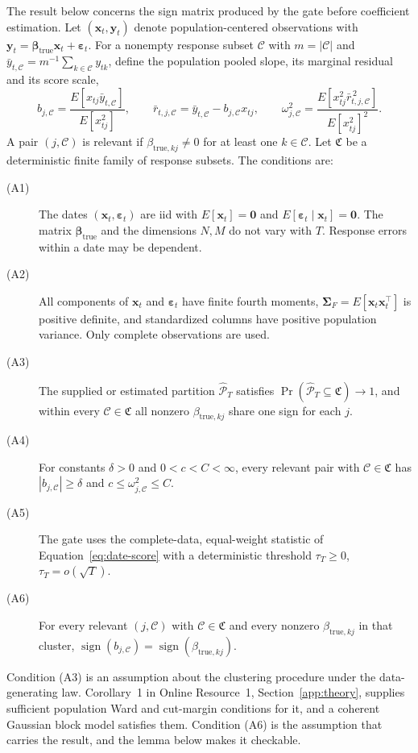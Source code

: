 \documentclass[lineno,pdflatex,sn-basic]{sn-jnl}
\theoremstyle{thmstyleone}
\begin{document}
The result below concerns the sign matrix produced by the gate before
coefficient estimation. Let $(\bm x_t,\bm y_t)$ denote population-centered
observations with $\bm y_t=\bm\beta_{\mathrm{true}}\bm x_t+\bm\varepsilon_t$.
For a nonempty response subset $\mathcal C$ with $m=|\mathcal C|$ and
$\bar y_{t,\mathcal C}=m^{-1}\sum_{k\in\mathcal C}y_{tk}$, define the
population pooled slope, its marginal residual and its score scale,
\begin{equation}\label{eq:population-objects}
 b_{j,\mathcal C}=\frac{E[x_{tj}\bar y_{t,\mathcal C}]}{E[x_{tj}^2]},\qquad
 \bar r_{t,j,\mathcal C}=\bar y_{t,\mathcal C}-b_{j,\mathcal C}x_{tj},\qquad
 \omega_{j,\mathcal C}^2
 =\frac{E[x_{tj}^2\bar r_{t,j,\mathcal C}^{\,2}]}{E[x_{tj}^2]^2}.
\end{equation}
A pair $(j,\mathcal C)$ is relevant if $\beta_{\mathrm{true},kj}\ne0$ for at
least one $k\in\mathcal C$. Let $\mathfrak C$ be a deterministic finite family
of response subsets. The conditions are:
\begin{description}
 \item[(A1)] The dates $(\bm x_t,\bm\varepsilon_t)$ are iid with
 $E[\bm x_t]=\bm0$ and $E[\bm\varepsilon_t\mid\bm x_t]=\bm0$. The
 matrix $\bm\beta_{\mathrm{true}}$ and the dimensions $N,M$ do not vary with $T$.
 Response errors within a date may be dependent.
 \item[(A2)] All components of $\bm x_t$ and $\bm\varepsilon_t$ have finite
 fourth moments, $\bm\Sigma_F=E[\bm x_t\bm x_t^\top]$ is positive definite,
 and standardized columns have positive population variance. Only complete
 observations are used.
 \item[(A3)] The supplied or estimated partition $\widehat{\mathcal P}_T$
 satisfies $\Pr(\widehat{\mathcal P}_T\subseteq\mathfrak C)\to1$, and within
 every $\mathcal C\in\mathfrak C$ all nonzero $\beta_{\mathrm{true},kj}$ share
 one sign for each $j$.
 \item[(A4)] For constants $\delta>0$ and $0<c<C<\infty$, every relevant pair
 with $\mathcal C\in\mathfrak C$ has $|b_{j,\mathcal C}|\geq\delta$ and
 $c\leq\omega_{j,\mathcal C}^2\leq C$.
 \item[(A5)] The gate uses the complete-data, equal-weight statistic of
 Equation~\eqref{eq:date-score} with a deterministic threshold
 $\tau_T\geq0$, $\tau_T=o(\sqrt T)$.
 \item[(A6)] For every relevant $(j,\mathcal C)$ with
 $\mathcal C\in\mathfrak C$ and every nonzero $\beta_{\mathrm{true},kj}$ in
 that cluster, $\operatorname{sign}(b_{j,\mathcal C})
 =\operatorname{sign}(\beta_{\mathrm{true},kj})$.
\end{description}
Condition (A3) is an assumption about the clustering procedure under the
data-generating law. Corollary~1 in Online Resource~1,
Section~\ref{app:theory}, supplies sufficient population Ward and cut-margin
conditions for it, and a coherent Gaussian block model satisfies them.
Condition (A6) is the assumption that carries the result, and the lemma below
makes it checkable.
\end{document}
